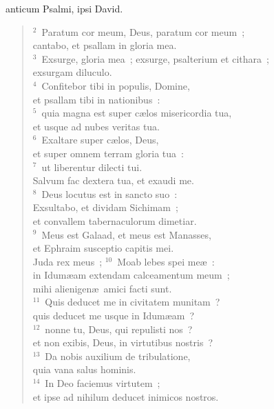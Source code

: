 \bchapter
{}anticum Psalmi, ipsi David.
\begin{flushleft}\begin{verse}\vspace{6pt}${}^{2}$~Paratum cor meum, Deus, paratum cor meum~;\\ cantabo, et psallam in gloria mea.\\
${}^{3}$~Exsurge, gloria mea~; exsurge, psalterium et cithara~;\\ exsurgam diluculo.\\
${}^{4}$~Confitebor tibi in populis, Domine,\\ et psallam tibi in nationibus~:\\
${}^{5}$~quia magna est super c\ae los misericordia tua,\\ et usque ad nubes veritas tua.\\
${}^{6}$~Exaltare super c\ae los, Deus,\\ et super omnem terram gloria tua~:\\
${}^{7}$~ut liberentur dilecti tui.\\ Salvum fac dextera tua, et exaudi me.\\
${}^{8}$~Deus locutus est in sancto suo~:\\ Exsultabo, et dividam Sichimam~;\\ et convallem tabernaculorum dimetiar.\\
${}^{9}$~Meus est Galaad, et meus est Manasses,\\ et Ephraim susceptio capitis mei.\\ Juda rex meus~;
${}^{10}$~Moab lebes spei me\ae~:\\ in Idum\ae am extendam calceamentum meum~;\\ mihi alienigen\ae\ amici facti sunt.\\
${}^{11}$~Quis deducet me in civitatem munitam~?\\ quis deducet me usque in Idum\ae am~?\\
${}^{12}$~nonne tu, Deus, qui repulisti nos~?\\ et non exibis, Deus, in virtutibus nostris~?\\
${}^{13}$~Da nobis auxilium de tribulatione,\\ quia vana salus hominis.\\
${}^{14}$~In Deo faciemus virtutem~;\\ et ipse ad nihilum deducet inimicos nostros.\end{verse}\end{flushleft}



